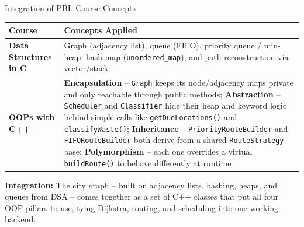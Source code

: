 \documentclass[aspectratio=169,11pt]{beamer}
\begin{document}
\begin{frame}{Integration of PBL Course Concepts}
\begin{center}
\renewcommand{\arraystretch}{1.25}
\scriptsize
\begin{tabularx}{.98\textwidth}{@{}>{\bfseries}p{2.4cm}X@{}}
\toprule
Course & Concepts Applied\\
\midrule
Data Structures in C & Graph (adjacency list), queue (FIFO), priority queue / min-heap, hash map (\texttt{unordered\_map}), and path reconstruction via vector/stack\\
OOPs with C++ & \textbf{Encapsulation} -- \texttt{Graph} keeps its node/adjacency maps private and only reachable through public methods; \textbf{Abstraction} -- \texttt{Scheduler} and \texttt{Classifier} hide their heap and keyword logic behind simple calls like \texttt{getDueLocations()} and \texttt{classifyWaste()}; \textbf{Inheritance} -- \texttt{PriorityRouteBuilder} and \texttt{FIFORouteBuilder} both derive from a shared \texttt{RouteStrategy} base; \textbf{Polymorphism} -- each one overrides a virtual \texttt{buildRoute()} to behave differently at runtime\\
\bottomrule
\end{tabularx}
\end{center}
\vspace{2mm}
\begin{center}
\colorbox{GEULightBlue}{\parbox{.9\textwidth}{\centering\small
\textbf{Integration:} The city graph -- built on adjacency lists, hashing, heaps, and queues from DSA -- comes together as a set of C++ classes that put all four OOP pillars to use, tying Dijkstra, routing, and scheduling into one working backend.}}
\end{center}
\end{frame}
\end{document}
